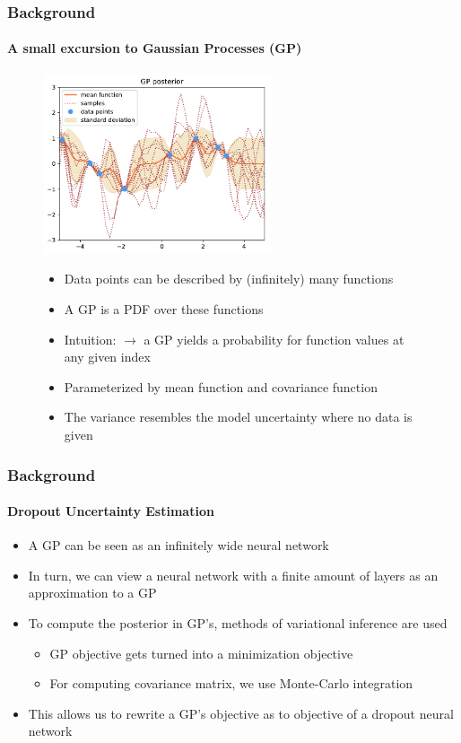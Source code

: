 \documentclass[9pt]{beamer}
\begin{document}
\begin{frame}
\frametitle{Background}
\framesubtitle{A small excursion to Gaussian Processes (GP)}
\begin{figure}
	\centering
	\includegraphics[width=0.6\textwidth]{images/post.pdf}
	\begin{itemize}
		\item Data points can be described by (infinitely) many functions
		\item A GP is a PDF over these functions
		\item Intuition: $\rightarrow$ a GP yields a probability for function values at any given index
		\item Parameterized by mean function and covariance function
		\item The variance resembles the model uncertainty where no data is given
	\end{itemize}
\end{figure}
\end{frame}


\begin{frame}
\frametitle{Background}
\framesubtitle{Dropout Uncertainty Estimation}
	\begin{itemize}
	\item A GP can be seen as an infinitely wide neural network
	\item In turn, we can view a neural network with a finite amount of layers as an approximation to a GP
	\item To compute the posterior in GP's, methods of variational inference are used
	\begin{itemize}
		\item GP objective gets turned into a minimization objective
		\item For computing covariance matrix, we use Monte-Carlo integration
	\end{itemize}
	\item This allows us to rewrite a GP's objective as to objective of a dropout neural network
\end{itemize}
\end{frame}
\end{document}
